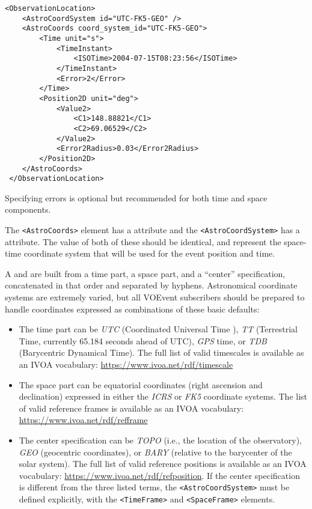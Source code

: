 \documentclass[11pt,a4paper]{ivoa}
\begin{document}
\begin{lstlisting}
<ObservationLocation>
    <AstroCoordSystem id="UTC-FK5-GEO" />
    <AstroCoords coord_system_id="UTC-FK5-GEO">
        <Time unit="s">
            <TimeInstant>
                <ISOTime>2004-07-15T08:23:56</ISOTime>
            </TimeInstant>
            <Error>2</Error>
        </Time>
        <Position2D unit="deg">
            <Value2>
                <C1>148.88821</C1>
                <C2>69.06529</C2>
            </Value2>
            <Error2Radius>0.03</Error2Radius>
        </Position2D>
    </AstroCoords>
 </ObservationLocation>
\end{lstlisting}

Specifying errors is optional but recommended for both time and space
components.

The \verb|<AstroCoords>| element has a  attribute and the
\verb|<AstroCoordSystem>| has a  attribute. The value of both of these
should be identical, and represent the space-time coordinate system that will be
used for the event position and time.

A  and  are built from a time part, a space part,
and a ``center'' specification, concatenated in that order and separated by
hyphens. Astronomical coordinate systems are extremely varied, but all VOEvent
subscribers should be prepared to handle coordinates expressed as combinations
of these basic defaults:
\begin{itemize}
\item The time part can be \emph{UTC} (Coordinated Universal Time
\citep{bib26}), \emph{TT} (Terrestrial Time, currently 65.184 seconds ahead of
UTC), \emph{GPS} time, or \emph{TDB} (Barycentric Dynamical Time). The full list
of valid timescales is available as an IVOA vocabulary:
\url{https://www.ivoa.net/rdf/timescale}
\item The space part can be equatorial coordinates (right ascension and
declination) expressed in either the \emph{ICRS} or \emph{FK5} coordinate
systems. The list of valid reference frames is available as an IVOA vocabulary:
\url{https://www.ivoa.net/rdf/refframe}
\item The center specification can be \emph{TOPO} (i.e., the location of the
observatory), \emph{GEO} (geocentric coordinates), or \emph{BARY} (relative to
the barycenter of the solar system). The full list of valid reference positions
is available as an IVOA vocabulary: \url{https://www.ivoa.net/rdf/refposition}.
If the center specification is different from the three listed terms, the
\verb|<AstroCoordSystem>| must be defined explicitly, with the \verb|<TimeFrame>|
and \verb|<SpaceFrame>| elements.
\end{itemize}
\end{document}
